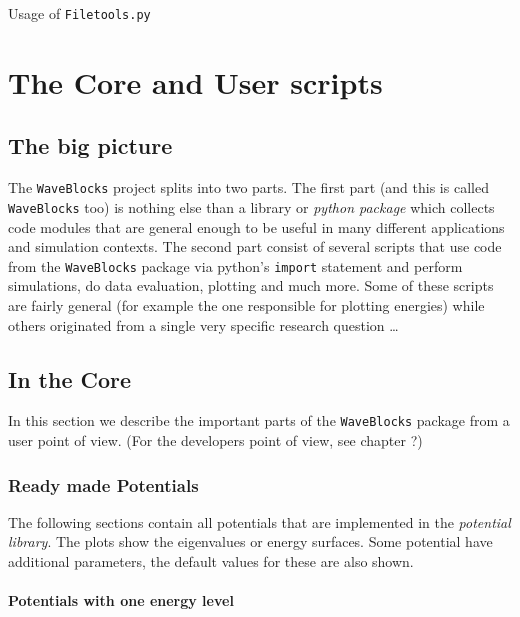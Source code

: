 \documentclass[a4paper,10pt]{report}
\begin{document}
Usage of \texttt{Filetools.py}









\chapter{The Core and User scripts}

\section{The big picture}

The \texttt{WaveBlocks} project splits into two parts. The first part (and this
is called \texttt{WaveBlocks} too) is nothing else than a library or \emph{python package}
which collects code modules that are general enough to be useful in many different applications
and simulation contexts. The second part consist of several scripts that use code
from the \texttt{WaveBlocks} package via python's \texttt{import} statement and
perform simulations, do data evaluation, plotting and much more. Some of these
scripts are fairly general (for example the one responsible for plotting energies)
while others originated from a single very specific research question \ldots

\section{In the Core}

In this section we describe the important parts of the \texttt{WaveBlocks} package
from a user point of view. (For the developers point of view, see chapter ?)

\subsection{Ready made Potentials}
\label{sec:ready_made_potentials}

The following sections contain all potentials that are implemented in the
\emph{potential library}. The plots show the eigenvalues or energy surfaces.
Some potential have additional parameters, the default values for these are
also shown.

\subsubsection{Potentials with one energy level}
\end{document}
